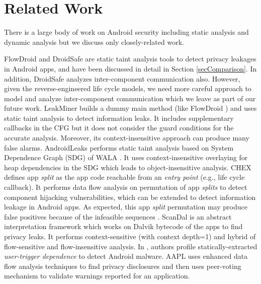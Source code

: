 \documentclass[10pt]{elsarticle}
\begin{document}
\section{Related Work} \label{relatedWork}

There is a large body of work on Android security including static analysis \cite{LeakMiner, FlowDroid, AppoScopy, myDroid, Chex, DroidSafe, AndroidLeaks, Elish2015255, ScanDal, AAPL, EdgeMiner, Anadroid, ICCTAFD, cmuICCTA, AppIntent} and dynamic analysis \cite{TaintDroid, VetDroid, DroidScope, DroidPF, DroidBox} but we discuss only closely-related work. 

FlowDroid \cite{FlowDroid} and DroidSafe \cite{DroidSafe} are static taint analysis tools to detect privacy leakages in Android apps, and have been discussed in detail in Section \ref{secComparison}. In addition, DroidSafe analyzes inter-component communication also. However, given the reverse-engineered life cycle models, we need more careful approach to model and analyze inter-component communication which we leave as part of our future work. LeakMiner \cite{LeakMiner} builds a dummy main method (like FlowDroid \cite{FlowDroid}) and uses static taint analysis to detect information leaks. It includes supplementary callbacks in the CFG but it does not consider the guard conditions for the accurate analysis. Moreover, its context-insensitive approach can produce many false alarms. AndroidLeaks \cite{AndroidLeaks} performs static taint analysis based on System Dependence Graph (SDG) of WALA \cite{WALA}. It uses context-insensitive overlaying for heap dependencies in the SDG which leads to object-insensitive analysis. CHEX \cite{Chex} defines app \emph{split} as the app code reachable from an \emph{entry point} (e.g., life cycle callback). It performs data flow analysis on permutation of app \emph{splits} to detect component hijacking vulnerabilities, which can be extended to detect information leakage in Android apps. As expected, this app \emph{split} permutation may produce false positives because of the infeasible sequences \cite{Chex}. ScanDal \cite{ScanDal} is an abstract interpretation framework which works on Dalvik bytecode of the apps to find privacy leaks. It performs context-sensitive (with context depth=1) and hybrid of flow-sensitive and flow-insensitive analysis. In \cite{Elish2015255}, authors profile statically-extracted \emph{user-trigger dependence} to detect Android malware. AAPL \cite{AAPL} uses enhanced data flow analysis techniques to find privacy disclosures and then uses peer-voting mechanism to validate warnings reported for an application. 
\end{document}
